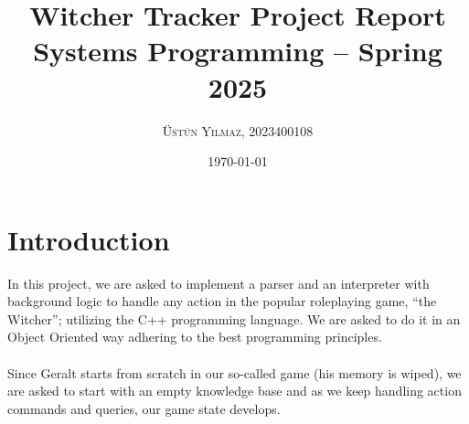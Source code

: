 \documentclass[a4paper,12pt]{article}
\title{\bfseries Witcher Tracker Project Report\\[\baselineskip] \large Systems Programming – Spring 2025}
\author{\textsc{Üstün Yılmaz, 2023400108}}
\date{\today}
\begin{document}
\maketitle


\section{Introduction}
In this project, we are asked to implement a parser and an interpreter with background logic to handle any action in the popular roleplaying game, “the Witcher”; utilizing the C++ programming language. We are asked to do it in an Object Oriented way adhering to the best programming principles.\\\\Since Geralt starts from scratch in our so-called game (his memory is wiped), we are asked to start with an empty knowledge base and as we keep handling action commands and queries, our game state develops.
\end{document}
